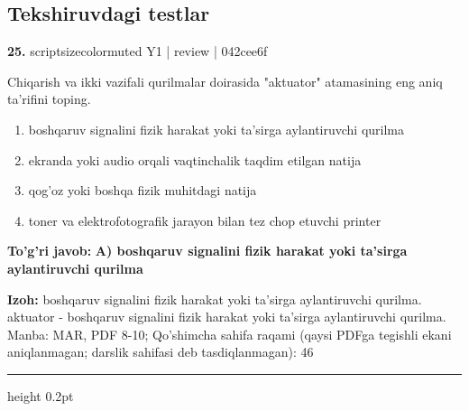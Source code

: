 \documentclass[10pt,a4paper]{article}
\begin{document}
\subsection{Tekshiruvdagi testlar}

{\bfseries\sffamily\color{ink} 25.} {scriptsizecolor{muted} Y1 | review | 042cee6f}
\par
Chiqarish va ikki vazifali qurilmalar doirasida "aktuator" atamasining eng aniq ta'rifini toping.
\begin{enumerate}[label=\Alph*),leftmargin=9mm]
\item boshqaruv signalini fizik harakat yoki ta'sirga aylantiruvchi qurilma
\item ekranda yoki audio orqali vaqtinchalik taqdim etilgan natija
\item qog'oz yoki boshqa fizik muhitdagi natija
\item toner va elektrofotografik jarayon bilan tez chop etuvchi printer
\end{enumerate}
\begin{tcolorbox}[enhanced,breakable,colback=teal!4,colframe=teal!60!black,boxrule=0.45pt,arc=1.2mm,left=2.7mm,right=2.7mm,top=1.8mm,bottom=1.8mm,before skip=2mm,after skip=2mm]
{\bfseries\sffamily\color{teal}To'g'ri javob:} \textbf{A) boshqaruv signalini fizik harakat yoki ta'sirga aylantiruvchi qurilma}
\par\smallskip
{\bfseries Izoh:} boshqaruv signalini fizik harakat yoki ta'sirga aylantiruvchi qurilma. aktuator - boshqaruv signalini fizik harakat yoki ta'sirga aylantiruvchi qurilma. Manba: MAR, PDF 8-10; Qo'shimcha sahifa raqami (qaysi PDFga tegishli ekani aniqlanmagan; darslik sahifasi deb tasdiqlanmagan): 46
\end{tcolorbox}
\vspace{2mm}\hrule height 0.2pt\vspace{3mm}
\end{document}
